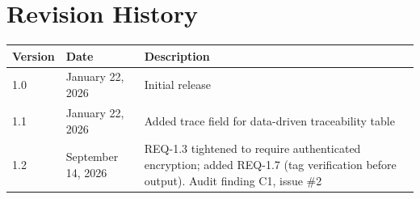 \documentclass[11pt,letterpaper]{article}
\begin{document}
\section{Revision History}

\begin{tabularx}{\textwidth}{llX}
\toprule
\textbf{Version} & \textbf{Date} & \textbf{Description} \\
\midrule
1.0 & January 22, 2026 & Initial release \\
1.1 & January 22, 2026 & Added trace field for data-driven traceability table \\
1.2 & September 14, 2026 & REQ-1.3 tightened to require authenticated encryption; added REQ-1.7 (tag verification before output). Audit finding C1, issue \#2 \\
\bottomrule
\end{tabularx}
\end{document}
